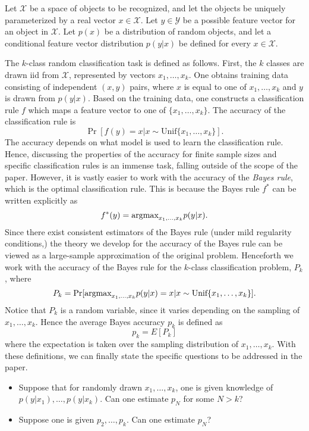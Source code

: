 \documentclass[12pt]{article}
\begin{document}
Let $\mathcal{X}$ be a space of objects to be recognized, and let the objects be uniquely parameterized
by a real vector $x \in \mathcal{X}$.
Let $y \in \mathcal{Y}$ be a possible feature vector for an object in $\mathcal{X}$.
Let $p(x)$ be a distribution of random objects, and let a conditional feature vector distribution
$p(y|x)$ be defined for every $x \in \mathcal{X}$.

The $k$-class random classification task is defined as follows.
First, the $k$ classes are drawn iid from $\mathcal{X}$, represented by vectors $x_1,\hdots, x_k$.
One obtains training data consisting of independent
$(x, y)$ pairs, where $x$ is equal to one of $x_1,\hdots, x_k$
and $y$ is drawn from $p(y|x)$.
Based on the training data, one constructs a classification rule $f$ which maps a feature vector
to one of $\{x_1,\hdots, x_k\}$.
The accuracy of the classification rule is
\[
\Pr[f(y) = x|x \sim \text{Unif}\{x_1,\hdots, x_k\}].
\]
The accuracy depends on what model is used to learn the classification rule.
Hence, discussing the properties of the accuracy for finite sample sizes and specific
classification rules is an immense task, falling outside of the scope of the paper.
However, it is vastly easier to work with the accuracy of the \emph{Bayes rule},
which is the optimal classification rule.
This is because the Bayes rule $f^*$ can be written explicitly as
\[
f^*(y) = \text{argmax}_{x_1,\hdots, x_k} p(y|x).
\]
Since there exist consistent estimators of the Bayes rule (under mild regularity conditions,)
the theory we develop for the accuracy of the Bayes rule can be viewed as a large-sample approximation
of the original problem.
Henceforth we work with the accuracy of the Bayes rule for the $k$-class classification problem, $P_k$,
where
\[
P_k = \Pr[\text{argmax}_{x_1,\hdots, x_k} p(y|x) = x | x \sim \text{Unif}\{x_1,\hdots, x_k\}].
\]
Notice that $P_k$ is a random variable, since it varies depending on the sampling of $x_1,\hdots, x_k$.
Hence the average Bayes accuracy $p_k$ is defined as
\[
p_k = E[P_k]
\]
where the expectation is taken over the sampling distribution of $x_1,\hdots, x_k$.
With these definitions, we can finally state the specific questions to be addressed in the paper.

\begin{itemize}
\item Suppose that for randomly drawn $x_1,\hdots, x_k$,
one is given knowledge of $p(y|x_1), \hdots, p(y|x_k)$.
Can one estimate $p_N$ for some $N > k$?
\item Suppose one is given $p_2,\hdots, p_k$. Can one estimate $p_N$?
\end{itemize}
\end{document}
